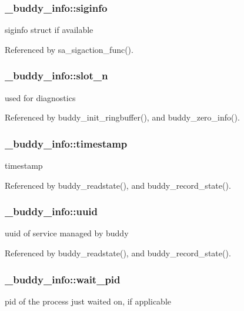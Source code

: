 \subsubsection[{siginfo}]{ {\bf \_\-buddy\_\-info::siginfo}}\label{struct__buddy__info_aad8330ed234bad72bad6a915548519da}
siginfo struct if available 

Referenced by sa\_\-sigaction\_\-func().

\subsubsection[{slot\_\-n}]{ {\bf \_\-buddy\_\-info::slot\_\-n}}\label{struct__buddy__info_aea38b50c414cf38d926ffe579e6449db}
used for diagnostics 

Referenced by buddy\_\-init\_\-ringbuffer(), and buddy\_\-zero\_\-info().

\subsubsection[{timestamp}]{ {\bf \_\-buddy\_\-info::timestamp}}\label{struct__buddy__info_ab7990ca27beae47735ee8cbf3376c3d7}
timestamp 

Referenced by buddy\_\-readstate(), and buddy\_\-record\_\-state().

\subsubsection[{uuid}]{ {\bf \_\-buddy\_\-info::uuid}}\label{struct__buddy__info_a677c1a945cf4e2571cdd29b7ae822439}
uuid of service managed by buddy 

Referenced by buddy\_\-readstate(), and buddy\_\-record\_\-state().

\subsubsection[{wait\_\-pid}]{ {\bf \_\-buddy\_\-info::wait\_\-pid}}\label{struct__buddy__info_af7057b15fc51781ce0bb63d717d59e2a}
pid of the process just waited on, if applicable 

